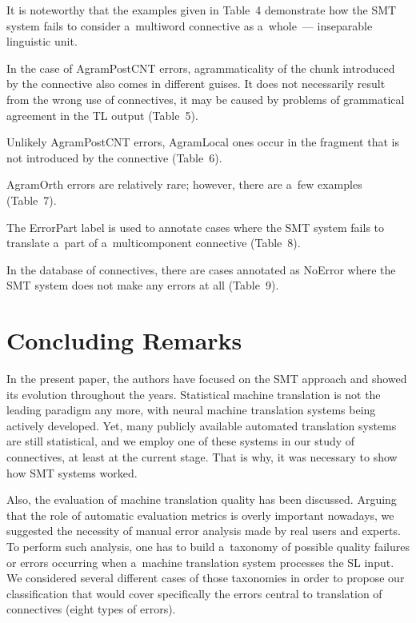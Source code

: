 \begin{multicols}{2}
 
  It is noteworthy that the examples given in Table~4
  demonstrate how the SMT system fails 
to consider a~multiword connective as a~whole~--- inseparable linguistic unit.
  
  In the case of AgramPostCNT errors, agrammaticality of the chunk introduced 
by the connective also comes in different guises. It does not necessarily result from 
the wrong use of connectives, it may be caused by problems of grammatical 
agreement in the TL output (Table~5).
  
  


  Unlikely AgramPostCNT errors, AgramLocal ones occur in the fragment that is 
not introduced by the connective (Table~6).
  

  

  
  AgramOrth errors are relatively rare; however, there are a~few examples 
(Table~7).
  
  

  
  The ErrorPart label is used to annotate cases where the SMT system fails to 
translate a~part of a~multicomponent connective (Table~8).
  


  In the database of connectives, there are cases annotated as NoError where the 
SMT system does not make any errors at all (Table~9).
  

\section{Concluding Remarks}


\noindent
  In the present paper, the authors have focused on the SMT approach and showed its evolution 
throughout the years. Statistical machine translation 
is not the leading paradigm any more, with neural 
machine translation systems being actively developed. Yet, many publicly 
available automated translation systems are still statistical, and we employ one of 
these systems in our study of connectives, at least at the current stage. That is why, 
it was necessary to show how SMT systems worked.
  
Also, the evaluation of machine translation quality has been  discussed. Arguing that 
the role of automatic evaluation metrics is overly important nowadays, we 
suggested the necessity of manual error analysis made by real users and experts. 
To perform such analysis, one has to build a~taxonomy of possible quality failures 
or errors occurring when a~machine translation system processes the SL input. We 
considered several different cases of those taxonomies in order to propose our 
classification that would cover specifically the errors central to translation of 
connectives (eight types of errors).
  

\end{multicols}
